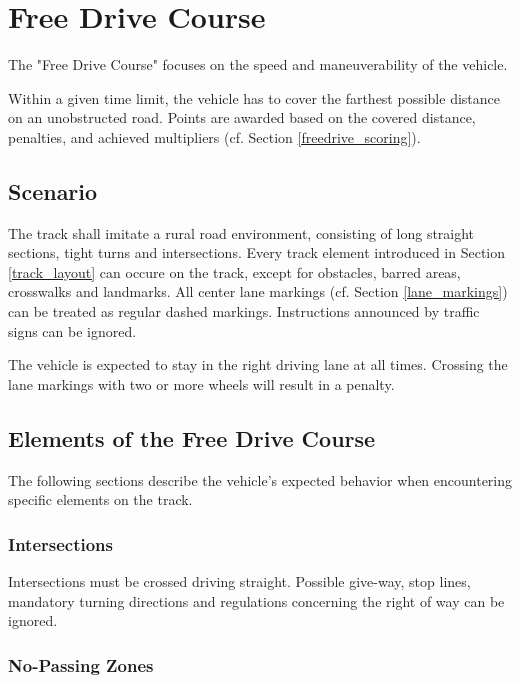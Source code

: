 \section{Free Drive Course}
\label{freedrive_course}

The "Free Drive Course" focuses on the speed and maneuverability of the vehicle.

Within a given time limit, the vehicle has to cover the farthest possible distance on an unobstructed road.
Points are awarded based on the covered distance, penalties, and achieved multipliers (cf. Section \ref{freedrive_scoring}).

\subsection{Scenario}

The track shall imitate a rural road environment, consisting of long straight sections, tight turns and intersections.
Every track element introduced in Section {\ref{track_layout}} can occure on the track, except for obstacles, barred areas, crosswalks and landmarks.
All center lane markings  (cf. Section \ref{lane_markings}) can be treated as regular dashed markings.
Instructions announced by traffic signs can be ignored.

The vehicle is expected to stay in the right driving lane at all times.
Crossing the lane markings with two or more wheels will result in a penalty.

\subsection{Elements of the Free Drive Course}
\label{elements_free_drive}

The following sections describe the vehicle's expected behavior when encountering specific elements on the track.

\subsubsection{Intersections}

Intersections must be crossed driving straight.
Possible give-way, stop lines, mandatory turning directions and regulations concerning the right of way can be ignored.

\subsubsection{No-Passing Zones}

